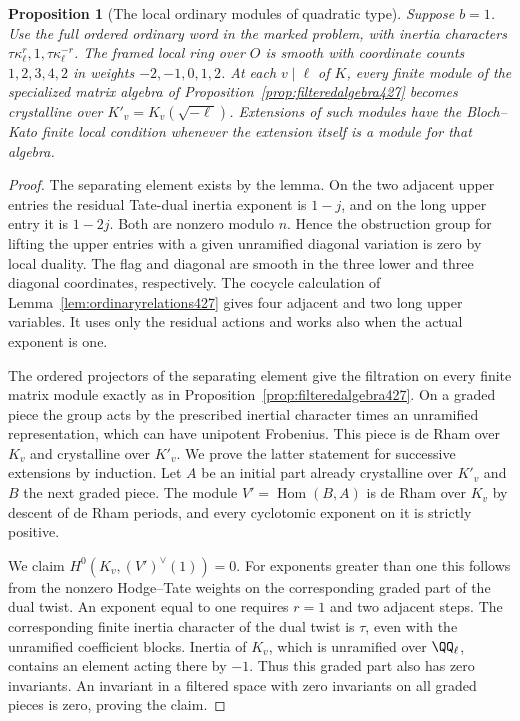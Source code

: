 \documentclass[a4paper,11pt]{article}
\newtheorem{proposition}{Proposition}[section]
\theoremstyle{definition}
\theoremstyle{remark}
\numberwithin{equation}{section}
\begin{document}
\begin{proposition}[The local ordinary modules of quadratic type]\leavevmode
\label{prop:tamecrystal428}
Suppose \(b=1\). Use the full ordered ordinary word in the marked
problem, with inertia characters
\(\tau\kappa_\ell^r,1,\tau\kappa_\ell^{-r}\).
The framed local ring over \(O\) is smooth with coordinate
counts \(1,2,3,4,2\) in weights \(-2,-1,0,1,2\).
At each \(v\mid\ell\) of \(K\), every finite module of the
specialized matrix algebra of Proposition~\ref{prop:filteredalgebra427}
becomes crystalline over \(K'_v=K_v(\sqrt{-\ell})\).
Extensions of such modules have the Bloch--Kato finite local
condition whenever the extension itself is a module for that algebra.
\end{proposition}
\begin{proof}
The separating element exists by the lemma. On the two
adjacent upper entries the residual Tate-dual inertia exponent
is \(1-j\), and on the long upper entry it is \(1-2j\).
Both are nonzero modulo \(n\). Hence the obstruction group
for lifting the upper entries with a given unramified diagonal
variation is zero by local duality. The flag and diagonal
are smooth in the three lower and three diagonal coordinates,
respectively. The cocycle calculation of
Lemma~\ref{lem:ordinaryrelations427} gives four adjacent
and two long upper variables. It uses only the residual
actions and works also when the actual exponent is one.

The ordered projectors of the separating element give the
filtration on every finite matrix module exactly as in
Proposition~\ref{prop:filteredalgebra427}. On a graded piece
the group acts by the prescribed inertial character times an
unramified representation, which can have unipotent Frobenius.
This piece is de Rham over \(K_v\) and crystalline over
\(K'_v\). We prove the latter statement for successive
extensions by induction. Let \(A\) be an initial part already
crystalline over \(K'_v\) and \(B\) the next graded piece.
The module \(V'=\operatorname{Hom}(B,A)\) is de Rham over
\(K_v\) by descent of de Rham periods, and every cyclotomic
exponent on it is strictly positive.

We claim \(H^0(K_v,(V')^\vee(1))=0\). For exponents greater
than one this follows from the nonzero Hodge--Tate weights
on the corresponding graded part of the dual twist. An
exponent equal to one requires \(r=1\) and two adjacent
steps. The corresponding finite inertia character of the
dual twist is \(\tau\), even with the unramified coefficient
blocks. Inertia of \(K_v\), which is unramified over
\(\QQ_\ell\), contains an element acting there by \(-1\).
Thus this graded part also has zero invariants. An invariant
in a filtered space with zero invariants on all graded pieces
is zero, proving the claim.


\end{proof}
\end{document}
